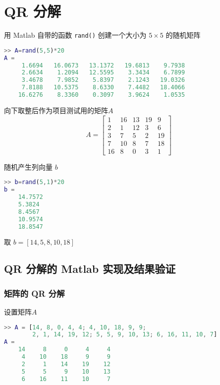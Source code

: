 \chapter{QR 分解}
用 Matlab 自带的函数 \lstinline|rand()| 创建一个大小为 $5\times 5$ 的随机矩阵


\begin{lstlisting}[language=Matlab]  
>> A=rand(5,5)*20
A =
     1.6694   16.0673   13.1372   19.6813    9.7938
     2.6634    1.2094   12.5595    3.3434    6.7899
     3.4678    7.9852    5.8397    2.1243   19.0326
     7.8188   10.5375    8.6330    7.4482   18.4066
    16.6276    8.3360    0.3097    3.9624    1.0535
\end{lstlisting}


向下取整后作为项目测试用的矩阵$A$
\begin{equation}
    A=\begin{bmatrix}
        1 & 16  & 13  & 19  & 9  \\
        2  & 1 & 12 & 3  & 6  \\
        3  & 7  & 5 & 2 & 19 \\
        7  & 10  & 8  & 7 & 18 \\
        16  & 8 & 0 & 3 & 1
    \end{bmatrix}
\end{equation}

随机产生列向量 $b$
\begin{lstlisting}[language=Matlab]  
>> b=rand(5,1)*20
b =
    14.7572
    5.3824
    8.4567
    10.9574
    18.8547
\end{lstlisting}

取 $b=[14,5,8,10,18]$

\section{QR 分解的 Matlab 实现及结果验证}
\subsection{矩阵的 QR 分解}



设置矩阵$A$
\begin{lstlisting}[language=Matlab]  
>> A = [14, 8, 0, 4, 4; 4, 10, 18, 9, 9;
        2, 1, 14, 19, 12; 5, 5, 9, 10, 13; 6, 16, 11, 10, 7]
A =
    14     8     0     4     4
     4    10    18     9     9
     2     1    14    19    12
     5     5     9    10    13
     6    16    11    10     7
\end{lstlisting}

